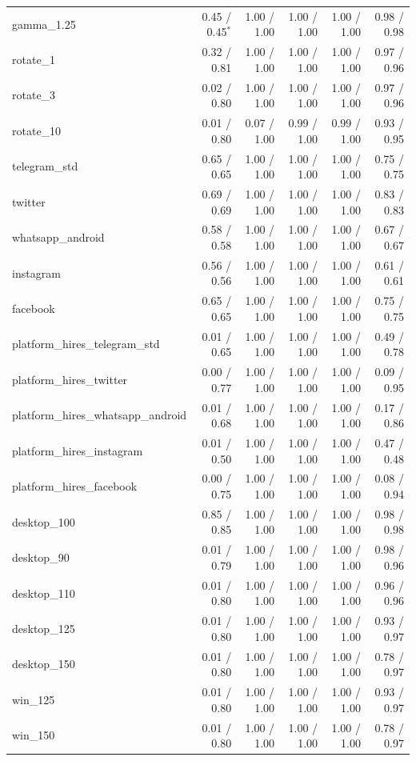 \begin{tabular}{lrrrrr}
gamma\_1.25 & 0.45 / 0.45$^*$ & 1.00 / 1.00 & 1.00 / 1.00 & 1.00 / 1.00 & 0.98 / 0.98 \\
rotate\_1 & 0.32 / 0.81 & 1.00 / 1.00 & 1.00 / 1.00 & 1.00 / 1.00 & 0.97 / 0.96 \\
rotate\_3 & 0.02 / 0.80 & 1.00 / 1.00 & 1.00 / 1.00 & 1.00 / 1.00 & 0.97 / 0.96 \\
rotate\_10 & 0.01 / 0.80 & 0.07 / 1.00 & 0.99 / 1.00 & 0.99 / 1.00 & 0.93 / 0.95 \\
telegram\_std & 0.65 / 0.65 & 1.00 / 1.00 & 1.00 / 1.00 & 1.00 / 1.00 & 0.75 / 0.75 \\
twitter & 0.69 / 0.69 & 1.00 / 1.00 & 1.00 / 1.00 & 1.00 / 1.00 & 0.83 / 0.83 \\
whatsapp\_android & 0.58 / 0.58 & 1.00 / 1.00 & 1.00 / 1.00 & 1.00 / 1.00 & 0.67 / 0.67 \\
instagram & 0.56 / 0.56 & 1.00 / 1.00 & 1.00 / 1.00 & 1.00 / 1.00 & 0.61 / 0.61 \\
facebook & 0.65 / 0.65 & 1.00 / 1.00 & 1.00 / 1.00 & 1.00 / 1.00 & 0.75 / 0.75 \\
platform\_hires\_telegram\_std & 0.01 / 0.65 & 1.00 / 1.00 & 1.00 / 1.00 & 1.00 / 1.00 & 0.49 / 0.78 \\
platform\_hires\_twitter & 0.00 / 0.77 & 1.00 / 1.00 & 1.00 / 1.00 & 1.00 / 1.00 & 0.09 / 0.95 \\
platform\_hires\_whatsapp\_android & 0.01 / 0.68 & 1.00 / 1.00 & 1.00 / 1.00 & 1.00 / 1.00 & 0.17 / 0.86 \\
platform\_hires\_instagram & 0.01 / 0.50 & 1.00 / 1.00 & 1.00 / 1.00 & 1.00 / 1.00 & 0.47 / 0.48 \\
platform\_hires\_facebook & 0.00 / 0.75 & 1.00 / 1.00 & 1.00 / 1.00 & 1.00 / 1.00 & 0.08 / 0.94 \\
desktop\_100 & 0.85 / 0.85 & 1.00 / 1.00 & 1.00 / 1.00 & 1.00 / 1.00 & 0.98 / 0.98 \\
desktop\_90 & 0.01 / 0.79 & 1.00 / 1.00 & 1.00 / 1.00 & 1.00 / 1.00 & 0.98 / 0.96 \\
desktop\_110 & 0.01 / 0.80 & 1.00 / 1.00 & 1.00 / 1.00 & 1.00 / 1.00 & 0.96 / 0.96 \\
desktop\_125 & 0.01 / 0.80 & 1.00 / 1.00 & 1.00 / 1.00 & 1.00 / 1.00 & 0.93 / 0.97 \\
desktop\_150 & 0.01 / 0.80 & 1.00 / 1.00 & 1.00 / 1.00 & 1.00 / 1.00 & 0.78 / 0.97 \\
win\_125 & 0.01 / 0.80 & 1.00 / 1.00 & 1.00 / 1.00 & 1.00 / 1.00 & 0.93 / 0.97 \\
win\_150 & 0.01 / 0.80 & 1.00 / 1.00 & 1.00 / 1.00 & 1.00 / 1.00 & 0.78 / 0.97 \\

\end{tabular}
